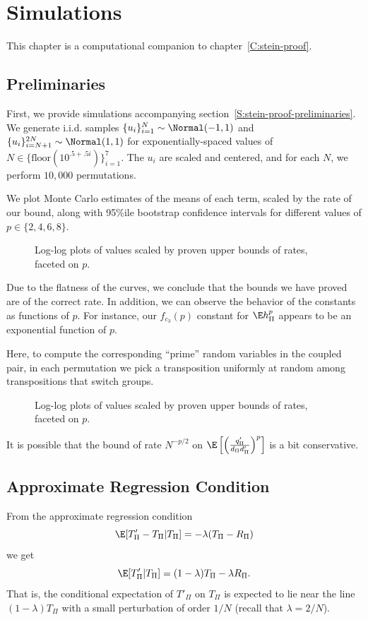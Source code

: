 \chapter{Simulations}
\label{C:simulations}
This chapter is a computational companion to chapter~\ref{C:stein-proof}.

\section{Preliminaries}
First, we provide simulations accompanying
section~\ref{S:stein-proof-preliminaries}.  We generate i.i.d. samples
$\{u_i\}_{i=1}^{N} \sim \Normal(-1, 1)$ and
$\{u_i\}_{i=N+1}^{2N} \sim \Normal(1, 1)$ for exponentially-spaced values of
$N \in \{\text{floor}(10^{.5+.5i})\}_{i=1}^7$.  The $u_i$ are scaled and
centered, and for each $N$, we perform $10,000$ permutations.

We plot Monte Carlo estimates of the means of each term, scaled by the
rate of our bound, along with 95\%ile bootstrap confidence intervals
for different values of $p \in \{2, 4, 6, 8\}$.

\begin{figure}[!ht]
  \centering
  
  \caption{Log-log plots of values scaled by proven upper bounds of rates, faceted on $p$.}
\end{figure}
Due to the flatness of the curves, we conclude that the bounds we have
proved are of the correct rate.  In addition, we can observe the
behavior of the constants as functions of $p$.  For instance, our
$f_{c_3}(p)$ constant for $\E h_{\Pi}^p$ appears to be an exponential
function of $p$.
\clearpage

Here, to compute the corresponding ``prime'' random variables in the
coupled pair, in each permutation we pick a transposition uniformly at
random among transpositions that switch groups.

\begin{figure}[!ht]
  \centering
  
  \caption{Log-log plots of values scaled by proven upper bounds of rates, faceted on $p$.}
\end{figure}
It is possible that the bound of rate $N^{-p/2}$ on
$\E \left [ \left ( \frac{q_{\Pi}'}{d_{\Pi}d_{\Pi}'} \right )^p \right ]$ is a bit conservative.
\clearpage

\section{Approximate Regression Condition}
From the approximate regression condition
\begin{equation*}
  \E [T'_{\Pi} - T_{\Pi} | T_{\Pi}] = -\lambda (T_{\Pi} - R_{\Pi})
\end{equation*}
we get
\begin{equation*}
  \E [T'_{\Pi}| T_{\Pi}] = (1-\lambda) T_{\Pi} - \lambda R_{\Pi}.
\end{equation*}
That is, the conditional expectation of $T'_{\Pi}$ on $T_{\Pi}$ is expected to lie near the line
$(1-\lambda) T_{\Pi}$ with a small perturbation of order $1 / N$ (recall that $\lambda = 2 / N$).

